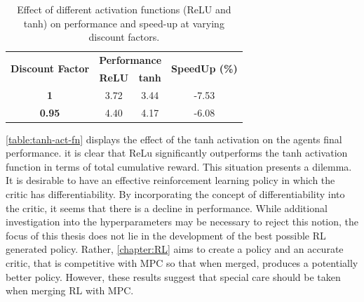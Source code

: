 	
\begin{table}[h!]
	\centering
	\begin{tabular}{c c c c}
		\toprule
		\multirow{2}{*}{\textbf{Discount Factor}} & \multicolumn{2}{c}{\textbf{Performance}} & \multirow{2}{*}{\textbf{SpeedUp (\%)}} \\
		\cmidrule{2-3}
		& \textbf{ReLU} & \textbf{tanh} &  \\
		\midrule
		\textbf{1}   & 3.72 & 3.44 & -7.53 \\
		\textbf{0.95} & 4.40 & 4.17 & -6.08 \\
		\bottomrule
	\end{tabular}
	\caption{Effect of different activation functions (ReLU and tanh) on performance and speed-up at varying discount factors.}
	\label{table:tanh-act-fn}
\end{table}
	



\autoref{table:tanh-act-fn} displays the effect of the tanh activation on the agents final performance. it is clear that ReLu significantly outperforms the tanh activation function in terms of total cumulative reward. This situation presents a dilemma. It is desirable to have an effective reinforcement learning policy in which the critic has differentiability. By incorporating the concept of differentiability into the critic, it seems that there is a decline in performance. While additional investigation into the hyperparameters may be necessary to reject this notion,  the focus of this thesis does not lie in the development of the best possible RL generated policy. Rather, \autoref{chapter:RL} aims to create a policy and an accurate critic, that is competitive with MPC so that when merged, produces a potentially better policy. However, these results suggest that special care should be taken when merging RL with MPC.

